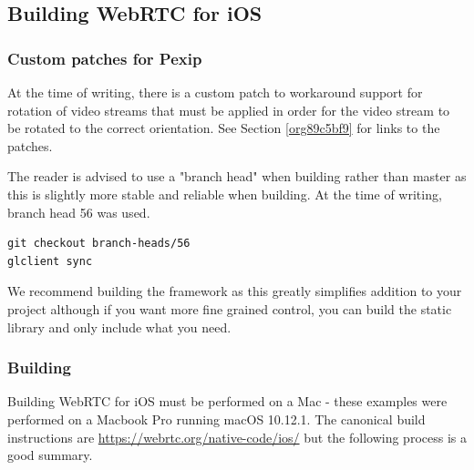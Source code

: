 \documentclass[a4paper,11pt]{article}
\begin{document}
\label{org7558b4b}

\subsection{Building WebRTC for iOS}
\label{sec:orga9c6f53}
\subsubsection{Custom patches for Pexip}
\label{sec:org69299e0}

At the time of writing, there is a custom patch to workaround support
for rotation of video streams that must be applied in order for the
video stream to be rotated to the correct orientation.  See Section
\ref{org89c5bf9} for links to the patches.

The reader is advised to use a "branch head" when building rather than
master as this is slightly more stable and reliable when building.  At
the time of writing, branch head 56 was used.

\begin{verbatim}
git checkout branch-heads/56
glclient sync
\end{verbatim}

We recommend building the framework as this greatly simplifies
addition to your project although if you want more fine grained
control, you can build the static library and only include what you
need.

\subsubsection{Building}
\label{sec:org6db1acd}

Building WebRTC for iOS must be performed on a Mac - these examples
were performed on a Macbook Pro running macOS 10.12.1.  The canonical
build instructions are \url{https://webrtc.org/native-code/ios/} but the
following process is a good summary.
\end{document}
